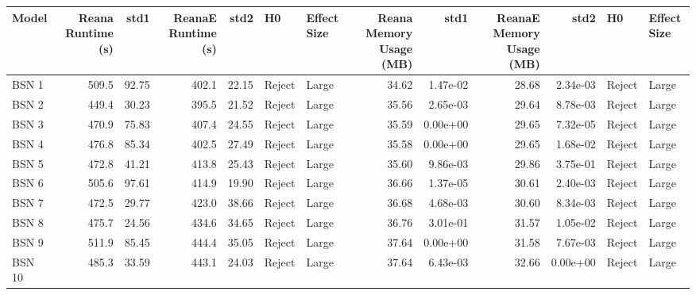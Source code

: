 \begin{tabular}{lrrrrllrrrrll}
\toprule
  Model &  Reana Runtime (s) &    std1 &  ReanaE Runtime (s) &    std2 &          H0 & Effect Size &  Reana Memory Usage (MB) &      std1 &  ReanaE Memory Usage (MB) &      std2 &      H0 & Effect Size \\
\midrule
  BSN 1 &              509.5 &   92.75 &               402.1 &   22.15 &      Reject &       Large &                    34.62 &  1.47e-02 &                     28.68 &  2.34e-03 &  Reject &       Large \\
  BSN 2 &              449.4 &   30.23 &               395.5 &   21.52 &      Reject &       Large &                    35.56 &  2.65e-03 &                     29.64 &  8.78e-03 &  Reject &       Large \\
  BSN 3 &              470.9 &   75.83 &               407.4 &   24.55 &      Reject &       Large &                    35.59 &  0.00e+00 &                     29.65 &  7.32e-05 &  Reject &       Large \\
  BSN 4 &              476.8 &   85.34 &               402.5 &   27.49 &      Reject &       Large &                    35.58 &  0.00e+00 &                     29.65 &  1.68e-02 &  Reject &       Large \\
  BSN 5 &              472.8 &   41.21 &               413.8 &   25.43 &      Reject &       Large &                    35.60 &  9.86e-03 &                     29.86 &  3.75e-01 &  Reject &       Large \\
  BSN 6 &              505.6 &   97.61 &               414.9 &   19.90 &      Reject &       Large &                    36.66 &  1.37e-05 &                     30.61 &  2.40e-03 &  Reject &       Large \\
  BSN 7 &              472.5 &   29.77 &               423.0 &   38.66 &      Reject &       Large &                    36.68 &  4.68e-03 &                     30.60 &  8.34e-03 &  Reject &       Large \\
  BSN 8 &              475.7 &   24.56 &               434.6 &   34.65 &      Reject &       Large &                    36.76 &  3.01e-01 &                     31.57 &  1.05e-02 &  Reject &       Large \\
  BSN 9 &              511.9 &   85.45 &               444.4 &   35.05 &      Reject &       Large &                    37.64 &  0.00e+00 &                     31.58 &  7.67e-03 &  Reject &       Large \\
 BSN 10 &              485.3 &   33.59 &               443.1 &   24.03 &      Reject &       Large &                    37.64 &  6.43e-03 &                     32.66 &  0.00e+00 &  Reject &       Large \\

\end{tabular}
